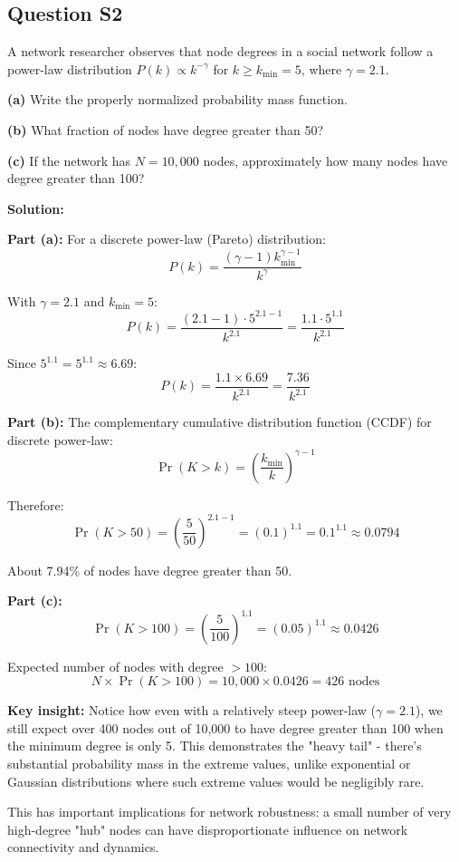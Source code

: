 \documentclass[11pt]{article}
\newenvironment{solution}
{\color{solutioncolor}\begin{framed}\textbf{Solution:}\par}
{\end{framed}}
\begin{document}
\subsection{Question S2}
A network researcher observes that node degrees in a social network follow a power-law distribution $P(k) \propto k^{-\gamma}$ for $k \geq k_{\min} = 5$, where $\gamma = 2.1$.

\textbf{(a)} Write the properly normalized probability mass function.

\textbf{(b)} What fraction of nodes have degree greater than 50?

\textbf{(c)} If the network has $N = 10,000$ nodes, approximately how many nodes have degree greater than 100?

\begin{solution}
\textbf{Part (a):}
For a discrete power-law (Pareto) distribution:
$$P(k) = \frac{(\gamma-1)k_{\min}^{\gamma-1}}{k^{\gamma}}$$

With $\gamma = 2.1$ and $k_{\min} = 5$:
$$P(k) = \frac{(2.1-1) \cdot 5^{2.1-1}}{k^{2.1}} = \frac{1.1 \cdot 5^{1.1}}{k^{2.1}}$$

Since $5^{1.1} = 5^{1.1} \approx 6.69$:
$$P(k) = \frac{1.1 \times 6.69}{k^{2.1}} = \frac{7.36}{k^{2.1}}$$

\textbf{Part (b):}
The complementary cumulative distribution function (CCDF) for discrete power-law:
$$\Pr(K > k) = \left(\frac{k_{\min}}{k}\right)^{\gamma-1}$$

Therefore:
$$\Pr(K > 50) = \left(\frac{5}{50}\right)^{2.1-1} = (0.1)^{1.1} = 0.1^{1.1} \approx 0.0794$$

About 7.94\% of nodes have degree greater than 50.

\textbf{Part (c):}
$$\Pr(K > 100) = \left(\frac{5}{100}\right)^{1.1} = (0.05)^{1.1} \approx 0.0426$$

Expected number of nodes with degree $> 100$:
$$N \times \Pr(K > 100) = 10,000 \times 0.0426 = 426 \text{ nodes}$$

\textbf{Key insight:} Notice how even with a relatively steep power-law ($\gamma = 2.1$), we still expect over 400 nodes out of 10,000 to have degree greater than 100 when the minimum degree is only 5. This demonstrates the "heavy tail" - there's substantial probability mass in the extreme values, unlike exponential or Gaussian distributions where such extreme values would be negligibly rare.

This has important implications for network robustness: a small number of very high-degree "hub" nodes can have disproportionate influence on network connectivity and dynamics.
\end{solution}
\end{document}
